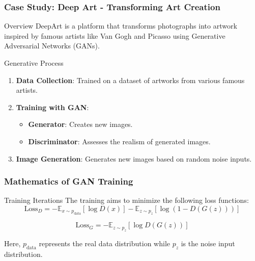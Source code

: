 \documentclass[aspectratio=169]{beamer}
\begin{document}
\begin{frame}[fragile]
  \frametitle{Case Study: Deep Art - Transforming Art Creation}
  \begin{block}{Overview}
    DeepArt is a platform that transforms photographs into artwork inspired by famous artists like Van Gogh and Picasso using Generative Adversarial Networks (GANs).
  \end{block}
  
  \begin{block}{Generative Process}
    \begin{enumerate}
      \item \textbf{Data Collection}: Trained on a dataset of artworks from various famous artists.
      \item \textbf{Training with GAN}:
        \begin{itemize}
          \item \textbf{Generator}: Creates new images.
          \item \textbf{Discriminator}: Assesses the realism of generated images.
        \end{itemize}
      \item \textbf{Image Generation}: Generates new images based on random noise inputs.
    \end{enumerate}
  \end{block}
\end{frame}

\begin{frame}[fragile]
  \frametitle{Mathematics of GAN Training}
  \begin{block}{Training Iterations}
    The training aims to minimize the following loss functions:
    \begin{equation}
      \text{Loss}_{D} = -\mathbb{E}_{x \sim p_{\text{data}}}[\log D(x)] - \mathbb{E}_{z \sim p_{z}}[\log(1 - D(G(z)))]
    \end{equation}

    \begin{equation}
      \text{Loss}_{G} = -\mathbb{E}_{z \sim p_{z}}[\log D(G(z))]
    \end{equation}
  \end{block}
  Here, \( p_{\text{data}} \) represents the real data distribution while \( p_{z} \) is the noise input distribution.
\end{frame}
\end{document}
